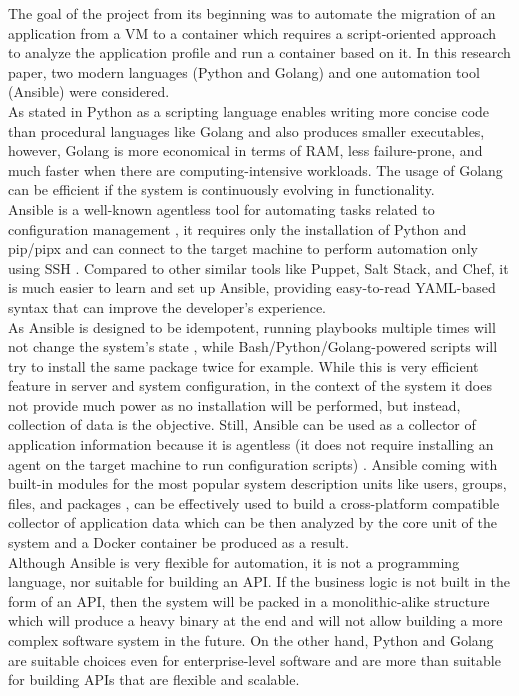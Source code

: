 \documentclass[twocolumn]{article}
\begin{document}
The goal of the project from its beginning was to automate the migration of an application from a VM to a container which requires a script-oriented approach to analyze the application profile and run a container based on it. In this research paper, two modern languages (Python and Golang) and one automation tool (Ansible) were considered. \\

As stated in \cite{NanzEtAl-2015} Python as a scripting language enables writing more concise code than procedural languages like Golang and also produces smaller executables, however, Golang is more economical in terms of RAM, less failure-prone, and much faster when there are computing-intensive workloads. The usage of Golang can be efficient if the system is continuously evolving in functionality. \\

Ansible is a well-known agentless tool for automating tasks related to configuration management \cite{Elradi-2023}, it requires only the installation of Python and pip/pipx \cite{Sesto-2022} and can connect to the target machine to perform automation only using SSH \cite{Elradi-2023}. Compared to other similar tools like Puppet, Salt Stack, and Chef, it is much easier to learn and set up Ansible, providing easy-to-read YAML-based syntax \cite{ChoiEtAl-2023} that can improve the developer’s experience. \\

As Ansible is designed to be idempotent, running playbooks multiple times will not change the system's state \cite{ChoiEtAl-2023}, while Bash/Python/Golang-powered scripts will try to install the same package twice for example. While this is very efficient feature in server and system configuration, in the context of the system it does not provide much power as no installation will be performed, but instead, collection of data is the objective. Still, Ansible can be used as a collector of application information because it is agentless (it does not require installing an agent on the target machine to run configuration scripts) \cite{ChoiEtAl-2023}. Ansible coming with built-in modules for the most popular system description units like users, groups, files, and packages \cite{Kumar-2023}, can be effectively used to build a cross-platform compatible collector of application data which can be then analyzed by the core unit of the system and a Docker container be produced as a result. \\

Although Ansible is very flexible for automation, it is not a programming language, nor suitable for building an API. If the business logic is not built in the form of an API, then the system will be packed in a monolithic-alike structure which will produce a heavy binary at the end and will not allow building a more complex software system in the future. On the other hand, Python and Golang are suitable choices even for enterprise-level software and are more than suitable for building APIs that are flexible and scalable. \\
\end{document}
